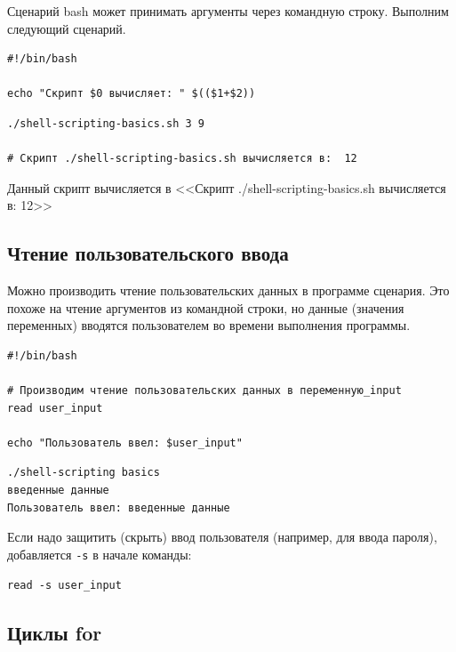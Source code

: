 \documentclass[a4paper,12pt,final,openany]{extbook}
\begin{document}
Сценарий bash может принимать аргументы через командную строку. Выполним
следующий сценарий.
\begin{verbatim}
#!/bin/bash

echo "Скрипт $0 вычисляет: " $(($1+$2))
\end{verbatim}

\begin{verbatim}
./shell-scripting-basics.sh 3 9

# Скрипт ./shell-scripting-basics.sh вычисляется в:  12
\end{verbatim}
Данный скрипт вычисляется в <<Скрипт ./shell-scripting-basics.sh
вычисляется в: 12>>


\hypertarget{Reading-user-input}{%
\subsection{\texorpdfstring{\protect\hyperlink{Reading-user-input}{}Чтение
пользовательского
ввода}{Чтение пользовательского ввода}}\label{Reading-user-input}}

Можно производить чтение пользовательских данных в программе сценария.
Это похоже на чтение аргументов из командной строки, но данные (значения
переменных) вводятся пользователем во времени выполнения программы.
\begin{verbatim}
#!/bin/bash

# Производим чтение пользовательских данных в переменную_input
read user_input

echo "Пользователь ввел: $user_input"
\end{verbatim}

\begin{verbatim}
./shell-scripting basics
введенные данные
Пользователь ввел: введенные данные
\end{verbatim}

Если надо защитить (скрыть) ввод пользователя (например, для ввода
пароля), добавляется \texttt{-s} в начале команды:

\begin{verbatim}
read -s user_input
\end{verbatim}

\hypertarget{for-loops}{%
\subsection{\texorpdfstring{\protect\hyperlink{for-loops}{}Циклы
for}{Циклы for}}\label{for-loops}}
\end{document}
